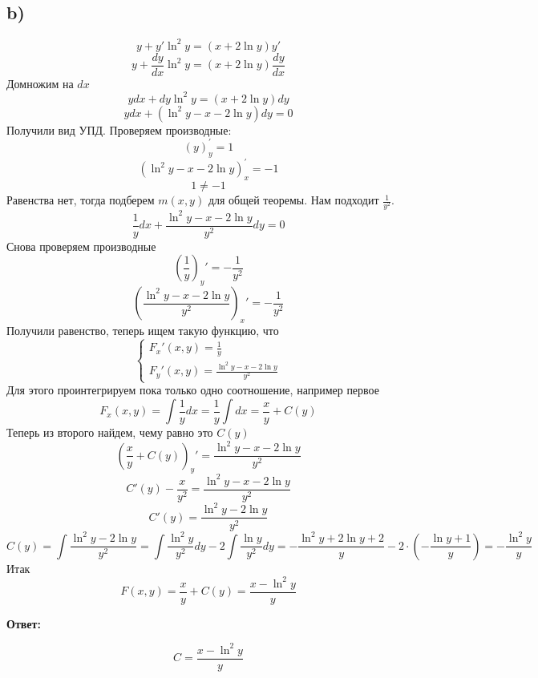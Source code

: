 \documentclass[a4paper,12pt]{article}
\begin{document}
\subsection*{b)}
\[
y + y' \ln^2y = (x + 2 \ln y) y'
\] 
\[
y + \frac{dy}{dx} \ln^2 y = (x + 2 \ln y) \frac{dy}{dx}
\]
Домножим на  $dx$
\[
ydx + dy \ln^2 y = (x + 2\ln y) dy 
\]
\[
y dx + (\ln^2 y - x - 2\ln y) dy = 0
\]
Получили вид УПД. Проверяем производные:
\[
(y)^{'}_y = 1
\]
\[
(\ln^2 y - x - 2\ln y)^{'}_x = -1 
\]
\[
1 \neq -1
\]
Равенства нет, тогда подберем  $m(x, y)$ для общей теоремы. Нам подходит $\frac{1}{y^2}$.
\[
\frac{1}{y} dx + \frac{\ln^2 y - x - 2\ln y}{y^2} dy = 0
\] 
Снова проверяем производные
\[
\left( \frac{1}{y}  \right)_y' = -\frac{1}{y^2}
\]
\[
\left( \frac{\ln^2 y - x - 2\ln y}{y^2} \right)_x' = -\frac{1}{y^2}
\]
Получили равенство, теперь ищем такую функцию, что
\[
\begin{cases}
F_x'(x, y) = \frac{1}{y} \\
F_y'(x, y) = \frac{\ln^2 y - x - 2\ln y}{y^2}
\end{cases}
\]
Для этого проинтегрируем пока только одно соотношение, например первое
\[
F_x(x, y) = \int \frac{1}{y} dx = \frac{1}{y} \int dx = \frac{x}{y} + C(y)
\]
Теперь из второго найдем, чему равно это $C(y)$
\[
\left( \frac{x}{y} + C(y) \right)_y' = \frac{\ln^2 y - x - 2\ln y}{y^2}
\]
\[
C'(y) -\frac{x}{y^2} = \frac{\ln^2 y - x - 2\ln y}{y^2}
\]
\[
C'(y) = \frac{\ln^2 y - 2\ln y}{y^2}
\]
\[
C(y) = \int \frac{\ln^2 y - 2\ln y}{y^2} = \int \frac{\ln^2 y}{y^2} dy - 2 \int \frac{\ln y}{y^2} dy = 
-\frac{\ln^2 y + 2 \ln y + 2}{y} - 2 \cdot \left(- \frac{\ln y + 1}{y}\right) = - \frac{\ln^2 y}{y}
\]
Итак
\[
F(x, y) = \frac{x}{y} + C(y) = \frac{x - \ln^2 y}{y}
\]
\begin{center}
\textbf{Ответ: } 
\end{center}
\[
C=  \frac{x - \ln^2 y}{y}
\]
\clearpage
\end{document}
